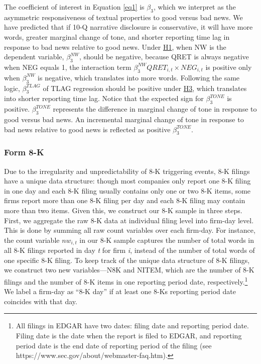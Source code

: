 \documentclass[letterpaper,12pt]{article}
\begin{document}
\begin{spacing}{1.5}
The coefficient of interest in Equation \eqref{eq1} is $\beta_3$, which we interpret as the asymmetric responsiveness of textual properties to good versus bad news. We have predicted that if 10-Q narrative disclosure is conservative, it will have more words, greater marginal change of tone, and shorter reporting time lag in response to bad news relative to good news. Under \hyperref[hyp:h1]{H1}, when NW is the dependent variable, $\beta_3^{NW}$,  should be negative, because QRET is always negative when NEG equals 1, the interaction term $\beta_3^{NW}QRET_{i,t}\times NEG_{i,t}$ is positive only when $\beta_3^{NW}$ is negative, which translates into more words. Following the same logic, $\beta_3^{TLAG}$ of TLAG regression should be positive under \hyperref[hyp:h3]{H3}, which translates into shorter reporting time lag. Notice that the expected sign for $\beta_3^{TONE}$ is positive. $\beta_3^{TONE}$ represents the difference in marginal change of tone in response to good versus bad news. An incremental marginal change of tone in response to bad news relative to good news is reflected as positive $\beta_3^{TONE}$.

\subsubsection{Form 8-K} \label{sec3.3.2}
\noindent Due to the irregularity and unpredictability of 8-K triggering events, 8-K filings have a unique data structure: though most companies only report one 8-K filing in one day and each 8-K filing usually contains only one or two 8-K items, some firms report more than one 8-K filing per day and each 8-K filing may contain more than two items. Given this, we construct our 8-K sample in three steps. First, we aggregate the raw 8-K data at individual filing level into firm-day level. This is done by summing all raw count variables over each firm-day. For instance, the count variable $nw_{i,t}$ in our 8-K sample captures the number of total words in all 8-K filings reported in day \textit{t} for firm \textit{i}, instead of the number of total words of one specific 8-K filing. To keep track of the unique data structure of 8-K filings, we construct two new variables---N8K and NITEM, which are the number of 8-K filings and the number of 8-K items in one reporting period date, respectively.\footnote{All filings in EDGAR have two dates: filing date and reporting period date. Filing date is the date when the report is filed to EDGAR, and reporting period date is the end date of reporting period of the filing (see https://www.sec.gov/about/webmaster-faq.htm).} We label a firm-day as ``8-K day” if at least one 8-Ks reporting period date coincides with that day.


\end{spacing}
\end{document}
